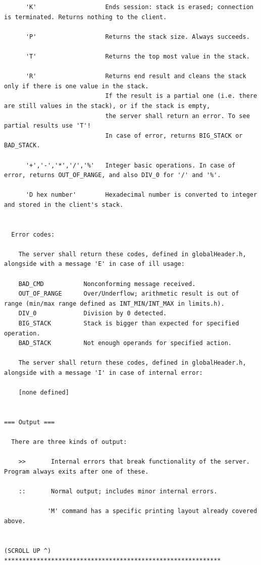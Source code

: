 \begin{lstlisting}
      'K'                   Ends session: stack is erased; connection is terminated. Returns nothing to the client.

      'P'                   Returns the stack size. Always succeeds.

      'T'                   Returns the top most value in the stack.

      'R'                   Returns end result and cleans the stack only if there is one value in the stack.
                            If the result is a partial one (i.e. there are still values in the stack), or if the stack is empty,
                            the server shall return an error. To see partial results use 'T'!
                            In case of error, returns BIG_STACK or BAD_STACK.

      '+','-','*','/','%'   Integer basic operations. In case of error, returns OUT_OF_RANGE, and also DIV_0 for '/' and '%'.

      'D hex number'        Hexadecimal number is converted to integer and stored in the client's stack.


  Error codes:

    The server shall return these codes, defined in globalHeader.h, alongside with a message 'E' in case of ill usage:

    BAD_CMD           Nonconforming message received.
    OUT_OF_RANGE      Over/Underflow; arithmetic result is out of range (min/max range defined as INT_MIN/INT_MAX in limits.h).
    DIV_0             Division by 0 detected.
    BIG_STACK         Stack is bigger than expected for specified operation.
    BAD_STACK         Not enough operands for specified action.

    The server shall return these codes, defined in globalHeader.h, alongside with a message 'I' in case of internal error:

    [none defined]


=== Output ===

  There are three kinds of output:

    >>       Internal errors that break functionality of the server. Program always exits after one of these.

    ::       Normal output; includes minor internal errors.

            'M' command has a specific printing layout already covered above.


(SCROLL UP ^)
************************************************************

\end{lstlisting}